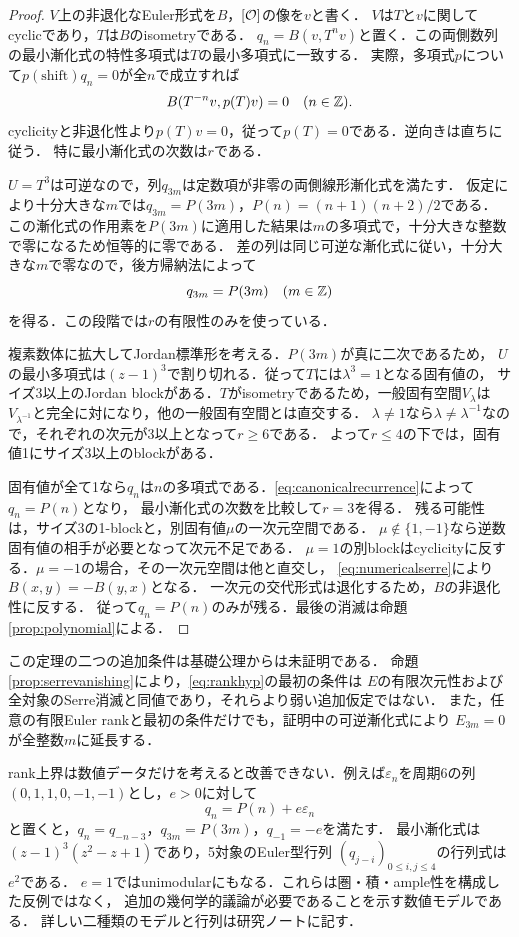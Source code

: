 \begin{proof}
$V$上の非退化なEuler形式を$B$，$[\mathcal O]$の像を$v$と書く．
$V$は$T$と$v$に関してcyclicであり，$T$は$B$のisometryである．
$q_n=B(v,T^nv)$と置く．この両側数列の最小漸化式の特性多項式は$T$の最小多項式に一致する．
実際，多項式$p$について$p(\mathrm{shift})q_n=0$が全$n$で成立すれば
\[
 B(T^{-n}v,p(T)v)=0\quad(n\in\mathbb Z).
\]
cyclicityと非退化性より$p(T)v=0$，従って$p(T)=0$である．逆向きは直ちに従う．
特に最小漸化式の次数は$r$である．

$U=T^3$は可逆なので，列$q_{3m}$は定数項が非零の両側線形漸化式を満たす．
仮定により十分大きな$m$では$q_{3m}=P(3m)$，$P(n)=(n+1)(n+2)/2$である．
この漸化式の作用素を$P(3m)$に適用した結果は$m$の多項式で，十分大きな整数で零になるため恒等的に零である．
差の列は同じ可逆な漸化式に従い，十分大きな$m$で零なので，後方帰納法によって
\begin{equation}\label{eq:canonicalrecurrence}
 q_{3m}=P(3m)\quad(m\in\mathbb Z)
\end{equation}
を得る．この段階では$r$の有限性のみを使っている．

複素数体に拡大してJordan標準形を考える．$P(3m)$が真に二次であるため，
$U$の最小多項式は$(z-1)^3$で割り切れる．従って$T$には$\lambda^3=1$となる固有値の，
サイズ3以上のJordan blockがある．$T$がisometryであるため，一般固有空間$V_\lambda$は
$V_{\lambda^{-1}}$と完全に対になり，他の一般固有空間とは直交する．
$\lambda\ne1$なら$\lambda\ne\lambda^{-1}$なので，それぞれの次元が3以上となって$r\geq6$である．
よって$r\leq4$の下では，固有値1にサイズ3以上のblockがある．

固有値が全て1なら$q_n$は$n$の多項式である．\eqref{eq:canonicalrecurrence}によって$q_n=P(n)$となり，
最小漸化式の次数を比較して$r=3$を得る．
残る可能性は，サイズ3の1-blockと，別固有値$\mu$の一次元空間である．
$\mu\notin\{1,-1\}$なら逆数固有値の相手が必要となって次元不足である．
$\mu=1$の別blockはcyclicityに反する．$\mu=-1$の場合，その一次元空間は他と直交し，
\eqref{eq:numericalserre}により$B(x,y)=-B(y,x)$となる．
一次元の交代形式は退化するため，$B$の非退化性に反する．
従って$q_n=P(n)$のみが残る．最後の消滅は命題\ref{prop:polynomial}による．
\end{proof}

この定理の二つの追加条件は基礎公理からは未証明である．
命題\ref{prop:serrevanishing}により，\eqref{eq:rankhyp}の最初の条件は
$E$の有限次元性および全対象のSerre消滅と同値であり，それらより弱い追加仮定ではない．
また，任意の有限Euler rankと最初の条件だけでも，証明中の可逆漸化式により
$E_{3m}=0$が全整数$m$に延長する．

rank上界は数値データだけを考えると改善できない．例えば$\varepsilon_n$を周期6の列
$(0,1,1,0,-1,-1)$とし，$e>0$に対して
\[
 q_n=P(n)+e\varepsilon_n
\]
と置くと，$q_n=q_{-n-3}$，$q_{3m}=P(3m)$，$q_{-1}=-e$を満たす．
最小漸化式は$(z-1)^3(z^2-z+1)$であり，5対象のEuler型行列
$(q_{j-i})_{0\leq i,j\leq4}$の行列式は$e^2$である．
$e=1$ではunimodularにもなる．これらは圏・積・ample性を構成した反例ではなく，
追加の幾何学的議論が必要であることを示す数値モデルである．
詳しい二種類のモデルと行列は研究ノートに記す．
